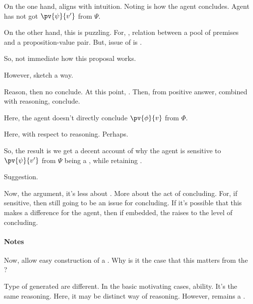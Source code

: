 \begin{note}
  On the one hand, aligns with intuition.
  Noting \fc{} is how the agent concludes.
  Agent has not got \(\pv{\psi}{v'}\) from \(\Psi\).

  On the other hand, this is puzzling.
  For, \support{}, relation between a pool of premises and a proposition-value pair.
  But, issue of \qzS{} is \support{}.

  So, not immediate how this proposal works.

  However, sketch a way.

  Reason, then no conclude.
  At this point, \qzS{}.
  Then, from positive answer, combined with reasoning, conclude.

  Here, the agent doesn't directly conclude \(\pv{\phi}{v}\) from \(\Phi\).

  Here, \qzS{} with respect to reasoning.
  Perhaps.

  So, the result is we get a decent account of why the agent is sensitive to \(\pv{\psi}{v'}\) from \(\Psi\) being a \fc{}, while retaining \issueConstraint{}.
\end{note}

\begin{note}
  Suggestion.
  
\end{note}

\begin{note}
  Now, the argument, it's less about .
  More about the act of concluding.
  For, if sensitive, then still going to be an issue for concluding.
  If it's possible that this makes a difference for the agent, then if embedded, the \fc{} raises to the level of concluding.
\end{note}





\paragraph{Notes}

\begin{note}
  Now,  allow easy construction of a \requ{}.
  Why is it the case that this matters from the \agpe{}?
\end{note}

\begin{note}
  Type of  generated are different.
  In the basic motivating cases, ability.
  It's the same reasoning.
  Here, it may be distinct way of reasoning.
  However, remains a \requ{}.
\end{note}

